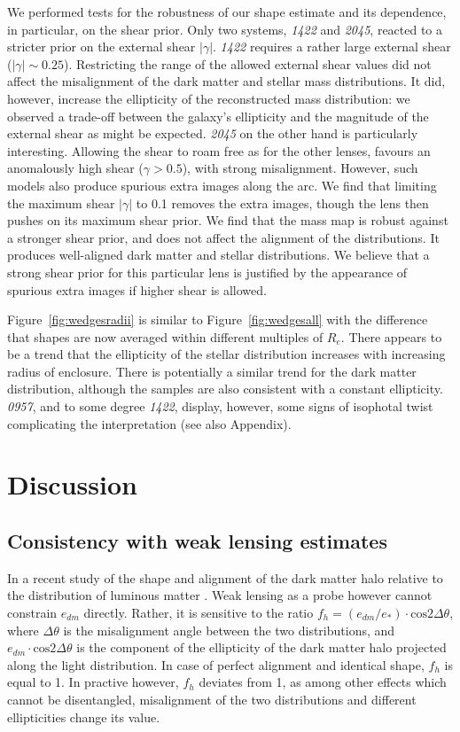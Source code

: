 \documentclass[useAMS,usenatbib]{mn2e}
\begin{document}
We performed tests for the robustness of our shape estimate and its dependence, in particular, on the shear prior. Only two systems, {\it1422} and {\it2045}, reacted to a stricter prior on the external shear $|\gamma|$. {\it1422} requires a rather large external shear ($|\gamma|\sim0.25$). Restricting the range of the allowed external shear values did not affect the misalignment of the dark matter and stellar mass distributions. It did, however, increase the ellipticity of the reconstructed mass distribution: we observed a trade-off between the galaxy's ellipticity and the magnitude of the external shear as might be expected. {\it2045} on the other hand is particularly interesting. Allowing the shear to roam free as for the other lenses, favours an anomalously high shear ($\gamma > 0.5$), with strong misalignment. However, such models also produce spurious extra images along the arc. We find that limiting the maximum shear $|\gamma|$ to 0.1 removes the extra images, though the lens then pushes on its maximum shear prior. We find that the mass map is robust against a stronger shear prior, and does not affect the alignment of the distributions. It produces well-aligned dark matter and stellar distributions. We believe that a strong shear prior for this particular lens is justified by the appearance of spurious extra images if higher shear is allowed.

Figure~\ref{fig:wedgesradii} is similar to Figure~\ref{fig:wedgesall} with the difference that shapes are now averaged within different multiples of $R_e$. There appears to be a trend that the ellipticity of the stellar distribution increases with increasing radius of enclosure. There is potentially a similar trend for the dark matter distribution, although the samples are also consistent with a constant ellipticity. {\it0957}, and to some degree {\it1422}, display, however, some signs of isophotal twist complicating the interpretation (see also Appendix).

\section{Discussion}

\subsection{Consistency with weak lensing estimates}
In a recent study of the shape and alignment of the dark matter halo relative to the distribution of luminous matter \citep{2015arXiv150704301S}. Weak lensing as a probe however cannot constrain $e_{dm}$ directly. Rather, it is sensitive to the ratio $f_{h} = (e_{dm}/e_{*})\cdot\mathrm{cos} 2\Delta\theta$, where $\Delta\theta$ is the misalignment angle between the two distributions, and $e_{dm}\cdot\mathrm{cos} 2\Delta\theta$ is the component of the ellipticity of the dark matter halo projected along the light distribution. In case of perfect alignment and identical shape, $f_{h}$ is equal to 1. In practive however, $f_{h}$ deviates from 1, as among other effects which cannot be disentangled, misalignment of the two distributions and different ellipticities change its value.
\end{document}
